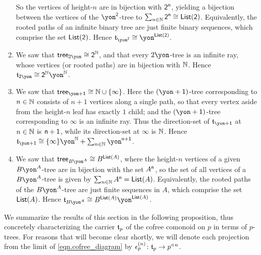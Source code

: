 \documentclass[Book-Poly]{subfiles}
\begin{document}
\begin{exercise}
\begin{solution}
\begin{enumerate}
    So the vertices of height-$n$ are in bijection with $\textsf{2}^{\mathsf{n}}$, yielding a bijection between the vertices of the $\yon^\2$-tree to $\sum_{n\in\mathbb{N}}\textsf{2}^{\mathsf{n}}\cong\mathsf{List}(\textsf{2})$.
    Equivalently, the rooted paths of an infinite binary tree are just finite binary sequences, which comprise the set $\mathsf{List}(\textsf{2})$.
    Hence $\car{t}_{\yon^\2}\iso\yon^{\lst(\2)}$.
    \item We saw that $\tr_{\2\yon}\iso\2^\nn$, and that every $2\yon$-tree is an infinite ray, whose vertices (or rooted paths) are in bijection with $\mathbb{N}$.
    Hence $\car{t}_{\2\yon}\iso\2^\nn\yon^\nn$.
    \item We saw that $\tr_{\yon+\1}\iso\nn\cup\{\infty\}$.
    Here the $(\yon+\1)$-tree corresponding to $n\in\mathbb{N}$ consists of $n+1$ vertices along a single path, so that every vertex aside from the height-$n$ leaf has exactly $1$ child; and the $(\yon+\1)$-tree corresponding to $\infty$ is an infinite ray.
    Thus the direction-set of $\car{t}_{\yon+\1}$ at $n\in\mathbb{N}$ is $\mathsf{n}+\textsf{1}$, while its direction-set at $\infty$ is $\mathbb{N}$.
    Hence $\car{t}_{\yon+\1}\iso\{\infty\}\yon^\nn+\sum_{n\in\nn}\yon^{\ord{n}+\1}$.
    \item We saw that $\tr_{B\yon^A}\iso B^{\lst(A)}$, where the height-$n$ vertices of a given $B\yon^A$-tree are in bijection with the set $A^{\mathsf{n}}$, so the set of all vertices of a $B\yon^A$-tree is given by $\sum_{n\in\mathbb{N}}A^{\mathsf{n}}=\mathsf{List}(A)$.
    Equivalently, the rooted paths of the $B\yon^A$-tree are just finite sequences in $A$, which comprise the set $\mathsf{List}(A)$.
    Hence $\car{t}_{B\yon^A}\iso B^{\lst(A)}\yon^{\lst(A)}$.
\end{enumerate}
\end{solution}
\end{exercise}

We summarize the results of this section in the following proposition, thus concretely characterizing the carrier $\mathfrak{t}_p$ of the cofree comonoid on $p$ in terms of $p$-trees.
For reasons that will become clear shortly, we will denote each projection from the limit of \eqref{eqn.cofree_diagram} by $\epsilon^{(n)}_p\colon\mathfrak{t}_p\to p^{\mathbin{\triangleleft}\,n}$.
\end{document}

